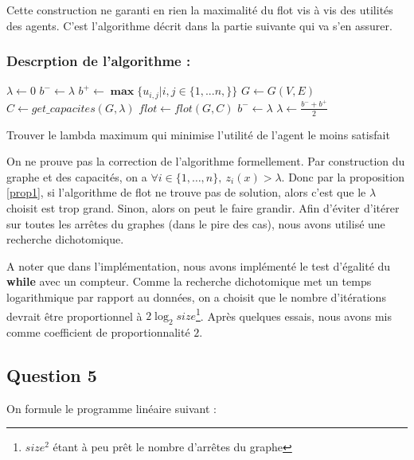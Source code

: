 \documentclass[a4paper, titlepage, oneside, 12pt]{article}%
\newcommand\boldmin{\mathop{\mathbf{min}}}
\newcommand\boldmax{\mathop{\mathbf{max}}}
\begin{document}
Cette construction ne garanti en rien la maximalité du flot vis à vis des utilités des agents. C'est l'algorithme décrit dans la partie suivante qui va s'en assurer.

\subsubsection{Descrption de l'algorithme : }
\begin{algorithm}
\DontPrintSemicolon %
\KwOut{$z^*=\boldmax \boldmin z_i(x)$}
$\lambda \gets 0$\;
$b^- \gets \lambda$\;
$b^+ \gets \boldmax \{u_{i,j} | i,j \in \{1,...n,\}\}$\;
$G \gets G(V,E)$\;
 {
  $C\gets get\_capacites(G,\lambda)$\;
  $flot \gets flot(G,C)$\;
   {
    $b^- \gets \lambda $\;
  }
  $\lambda \gets \frac{b^- + b^+}{2}$\;
}

\Return{$\lambda$}\;
\caption{Trouver le lambda maximum qui minimise l'utilité de l'agent le moins satisfait}
\label{algo:max}
\end{algorithm}
    

On ne prouve pas la correction de l'algorithme formellement. Par construction du graphe et des capacités, on a $\forall i \in \{1,\dots, n\},\ z_i(x)>\lambda$. Donc par la proposition \ref{prop1}, si l'algorithme de flot ne trouve pas de solution, alors c'est que le $\lambda$ choisit est trop grand. Sinon, alors on peut le faire grandir. Afin d'éviter d'itérer sur toutes les arrêtes du graphes (dans le pire des cas), nous avons utilisé une recherche dichotomique.

A noter que dans l'implémentation, nous avons implémenté le test d'égalité du \textbf{while} avec un compteur. Comme la recherche dichotomique met un temps logarithmique par rapport au données, on a choisit que le nombre d'itérations devrait être proportionnel à $2\log_2 size$\footnote{$size^2$ étant à peu prêt le nombre d'arrêtes du graphe}. Après quelques essais, nous avons mis comme coefficient de proportionnalité $2$.

\subsection{Question 5}
On formule le programme linéaire suivant :
\end{document}
